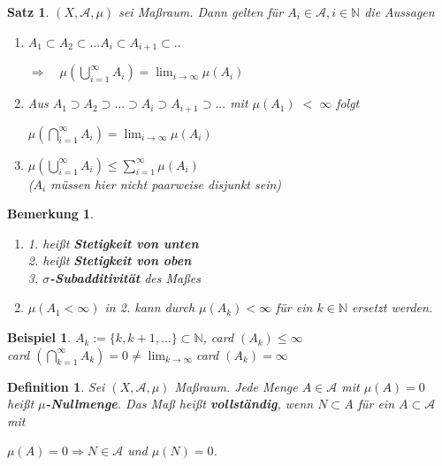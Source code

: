 \documentclass[11pt]{memoir}
\theoremstyle{changebreak}
\newtheorem{Definition}{Definition}[chapter]
\newtheorem{Bemerkung}{Bemerkung}[chapter]
\newtheorem{Beispiel}{Beispiel}[chapter]
\newtheorem{Satz}{Satz}[chapter]
\begin{document}
\begin{Satz}
$(X, \mathscr{A}, \mu)$ sei Maßraum. Dann gelten für $A_i \in \mathscr{A}, i \in \mathbb{N}$ die Aussagen
\begin{enumerate}
	\item $A_1 \subset A_2 \subset ...  A_i \subset A_{i+1} \subset .. $
	\begin{center}
		$\Rightarrow \quad \mu\left(\bigcup\limits_{i=1}^{\infty} A_i\right) = \lim_{i \rightarrow \infty} \mu(A_i)$
	\end{center}
	\item Aus $A_1 \supset A_2 \supset ... \supset A_i \supset A_{i+1} \supset ...$ mit $\mu(A_1)\; < \;  \infty$ folgt
	\begin{center}
		$\mu\left(\bigcap\limits_{i=1}^{\infty} A_i\right) = \lim_{i \rightarrow \infty} \mu(A_i)$
	\end{center}
	\item $\mu\left(\bigcup\limits_{i=1}^{\infty} A_i\right) \leq \sum\limits_{i=1}^{\infty} \mu(A_i)$ \\
	($A_i$ müssen hier nicht paarweise disjunkt sein)
\end{enumerate}
\end{Satz}

\begin{Bemerkung}
\begin{enumerate}
	\item \emph{1.} heißt \textbf{Stetigkeit von unten} \\
	\emph{2.} heißt \textbf{Stetigkeit von oben} \\
	\emph{3.} \textbf{$\sigma$-Subadditivität} des Maßes
	\item  $\mu(A_1 < \infty)$ in \emph{2.} kann durch $\mu(A_k) < \infty$ für ein $k \in \mathbb{N}$ ersetzt werden.
\end{enumerate}
\end{Bemerkung}

\begin{Beispiel}
$A_k := \{k, k+1, ... \} \subset \mathbb{N}$, card $(A_k) \leq \infty$ \\
card $\left(\bigcap\limits_{k=1}^{\infty} A_k\right) = 0 \ne \lim_{k \rightarrow \infty} $card  $(A_k) = \infty$
\end{Beispiel}

\begin{Definition}
Sei $(X, \mathscr{A}, \mu)$ Maßraum. Jede Menge $A \in \mathscr{A}$ mit $\mu(A) = 0$ heißt \textbf{$\mu$-Nullmenge}. Das Maß heißt \textbf{vollständig}, wenn $N \subset A $ für ein $A \subset \mathscr{A}$ mit 
\begin{center}
	$\mu(A) = 0 \Rightarrow N \in \mathscr{A}$ \; und \; $\mu(N) = 0$.
\end{center}
\end{Definition}
\end{document}
